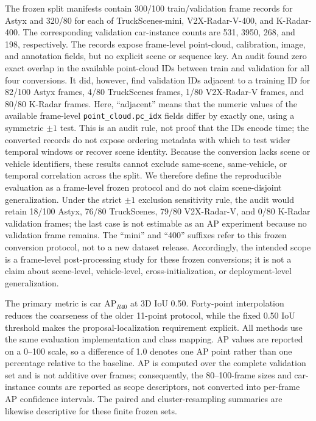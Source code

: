 \documentclass[preprint,12pt,times]{elsarticle}
\begin{document}
The frozen split manifests contain 300/100 train/validation frame records for
Astyx and 320/80 for each of TruckScenes-mini, V2X-Radar-V-400, and
K-Radar-400. The corresponding validation car-instance counts are 531, 3950,
268, and 198, respectively. The records expose frame-level point-cloud,
calibration, image, and annotation fields, but no explicit scene or sequence
key. An audit found zero exact overlap in the available point-cloud IDs
between train and validation for all four conversions. It did, however, find
validation IDs adjacent to a training ID for 82/100 Astyx frames, 4/80
TruckScenes frames, 1/80 V2X-Radar-V frames, and 80/80 K-Radar frames. Here,
``adjacent'' means that the numeric values of the available frame-level
\texttt{point\_cloud.pc\_idx} fields differ by exactly one, using a symmetric
$\pm1$ test. This is an audit rule, not proof that the IDs encode time; the
converted records do not expose ordering metadata with which to test wider
temporal windows or recover scene identity. Because
the conversion lacks scene or vehicle identifiers, these results cannot
exclude same-scene, same-vehicle, or temporal correlation across the split.
We therefore define the reproducible evaluation as a frame-level frozen
protocol and do not claim scene-disjoint generalization. Under the strict
$\pm1$ exclusion sensitivity rule, the audit would retain 18/100 Astyx,
76/80 TruckScenes, 79/80 V2X-Radar-V, and 0/80 K-Radar validation frames;
the last case is not estimable as an AP experiment because no validation frame
remains. The ``mini'' and
``400'' suffixes refer to this frozen conversion protocol, not to a new
dataset release. Accordingly, the intended scope is a frame-level
post-processing study for these frozen conversions; it is not a claim about
scene-level, vehicle-level, cross-initialization, or deployment-level
generalization.

The primary metric is car AP$_{R40}$ at 3D IoU 0.50. Forty-point interpolation
reduces the coarseness of the older 11-point protocol, while the fixed 0.50
IoU threshold makes the proposal-localization requirement explicit. All
methods use the same evaluation implementation and class mapping. AP values
are reported on a 0--100 scale, so a difference of 1.0 denotes one AP point
rather than one percentage relative to the baseline. AP is computed over the
complete validation set and is not additive over frames; consequently, the
80--100-frame sizes and car-instance counts are reported as scope descriptors,
not converted into per-frame AP confidence intervals. The paired and
cluster-resampling summaries are likewise descriptive for these finite frozen
sets.
\end{document}
